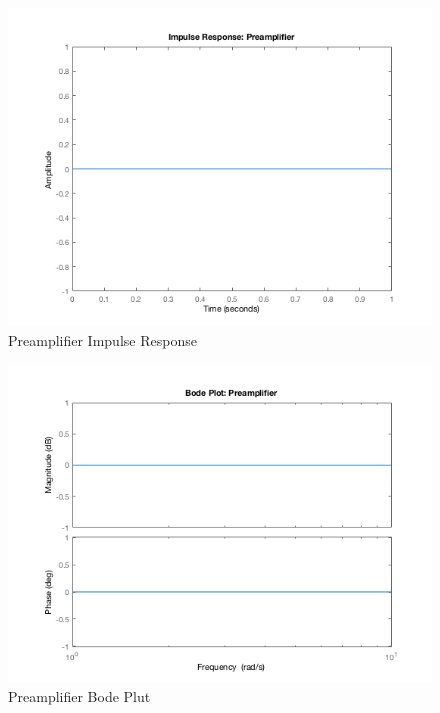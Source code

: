 \documentclass[12pt]{article}
\begin{document}
\begin{figure}[H]
\begin{center}
	\includegraphics[width=\textwidth]{./img/PreampImpulse.png}
	\caption{\label{fig:preampimpulse}Preamplifier Impulse Response}
\end{center}
\end{figure}

\begin{figure}[H]
\begin{center}
	\includegraphics[width=\textwidth]{./img/PreampBode.png}
	\caption{\label{fig:preampbode}Preamplifier Bode Plut}
\end{center}
\end{figure}
\end{document}
